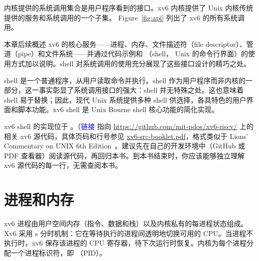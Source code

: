 内核提供的系统调用集合是用户程序看到的接口。xv6 内核提供了 Unix 内核传统提供的服务和系统调用的一个子集。
Figure~\ref{fig:api}
列出了 xv6 的所有系统调用。

本章后续概述 xv6 的核心服务——进程、内存、文件描述符（file descriptor）、管道（pipe）和文件系统——并通过代码示例和
（shell，
Unix 的命令行界面）的使用方式加以说明。shell 对系统调用的使用充分展现了这些接口设计的精巧之处。

shell 是一个普通程序，从用户读取命令并执行。shell 作为用户程序而非内核的一部分，这一事实彰显了系统调用接口的强大：shell 并无特殊之处。这也意味着 shell 易于替换；因此，现代 Unix 系统提供多种 shell 供选择，各具特色的用户界面和脚本功能。xv6 shell 是 Unix Bourne shell 核心功能的简化实现。

xv6 shell 的实现位于
。（\textcolor{blue}{链接}
指向
\url{https://github.com/mit-pdos/xv6-riscv/}
上的相关 xv6 源代码，具体页码和行号参见
\href{xv6-src-booklet.pdf}{xv6-src-booklet.pdf}，格式类似于 Lions' Commentary on UNIX 6th Edition~\cite{lions}。建议先在自己的开发环境中（GitHub 或 PDF 查看器）阅读源代码，再回归本书。到本书结束时，你应该能够独立理解 xv6 源代码的每一行，无需查阅本书。


\section{进程和内存}

xv6 进程由用户空间内存（指令、数据和栈）以及内核私有的每进程状态组成。Xv6 采用
s
分时机制：它在等待执行的进程间透明地切换可用的 CPU。当进程不执行时，xv6 保存该进程的 CPU 寄存器，待下次运行时恢复。内核为每个进程分配一个进程标识符，即
（PID）。


